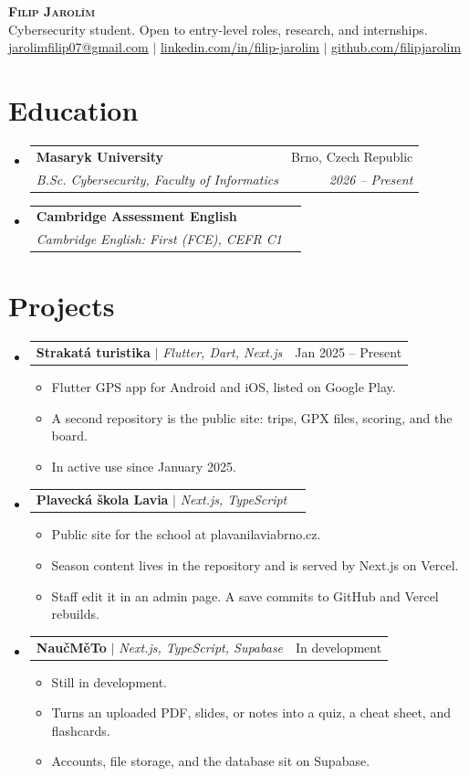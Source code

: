 \documentclass[letterpaper,11pt]{article}
\makeatletter
\newcommand{\resumeItem}[1]{
  \item\small{
    {#1 \vspace{-2pt}}
  }
}
\newcommand{\resumeSubheading}[4]{
  \vspace{-2pt}\item
    \begin{tabular*}{0.97\textwidth}[t]{l@{\extracolsep{\fill}}r}
      \textbf{#1} & #2 \\
      \textit{\small#3} & \textit{\small #4} \\
    \end{tabular*}\vspace{-7pt}
}
\newcommand{\resumeProjectHeading}[2]{
    \item
    \begin{tabular*}{0.97\textwidth}{l@{\extracolsep{\fill}}r}
      \small#1 & #2 \\
    \end{tabular*}\vspace{-7pt}
}
\newcommand{\resumeSubHeadingListStart}{\begin{itemize}[leftmargin=0.15in, label={}]}
\newcommand{\resumeSubHeadingListEnd}{\end{itemize}}
\newcommand{\resumeItemListStart}{\begin{itemize}}
\newcommand{\resumeItemListEnd}{\end{itemize}\vspace{-5pt}}
\makeatother
\begin{document}
\begin{center}
    \textbf{\Huge \scshape Filip Jarolím} \\ \vspace{1pt}
    \small Cybersecurity student. Open to entry-level roles, research, and internships. \\ \vspace{2pt}
    \small \href{mailto:jarolimfilip07@gmail.com}{\underline{jarolimfilip07@gmail.com}} $|$
    \href{https://www.linkedin.com/in/filip-jarolim}{\underline{linkedin.com/in/filip-jarolim}} $|$
    \href{https://github.com/filipjarolim}{\underline{github.com/filipjarolim}}
\end{center}


\section{Education}
  \resumeSubHeadingListStart
    \resumeSubheading
      {Masaryk University}{Brno, Czech Republic}
      {B.Sc. Cybersecurity, Faculty of Informatics}{2026 -- Present}
    \resumeSubheading
      {Cambridge Assessment English}{}
      {Cambridge English: First (FCE), CEFR C1}{}
  \resumeSubHeadingListEnd


\section{Projects}
    \resumeSubHeadingListStart
      \resumeProjectHeading
          {\textbf{Strakatá turistika} $|$ \emph{Flutter, Dart, Next.js}}{Jan 2025 -- Present}
          \resumeItemListStart
            \resumeItem{Flutter GPS app for Android and iOS, listed on Google Play.}
            \resumeItem{A second repository is the public site: trips, GPX files, scoring, and the board.}
            \resumeItem{In active use since January 2025.}
          \resumeItemListEnd
      \resumeProjectHeading
          {\textbf{Plavecká škola Lavia} $|$ \emph{Next.js, TypeScript}}{}
          \resumeItemListStart
            \resumeItem{Public site for the school at plavanilaviabrno.cz.}
            \resumeItem{Season content lives in the repository and is served by Next.js on Vercel.}
            \resumeItem{Staff edit it in an admin page. A save commits to GitHub and Vercel rebuilds.}
          \resumeItemListEnd
      \resumeProjectHeading
          {\textbf{NaučMěTo} $|$ \emph{Next.js, TypeScript, Supabase}}{In development}
          \resumeItemListStart
            \resumeItem{Still in development.}
            \resumeItem{Turns an uploaded PDF, slides, or notes into a quiz, a cheat sheet, and flashcards.}
            \resumeItem{Accounts, file storage, and the database sit on Supabase.}
          \resumeItemListEnd
    \resumeSubHeadingListEnd
\end{document}
